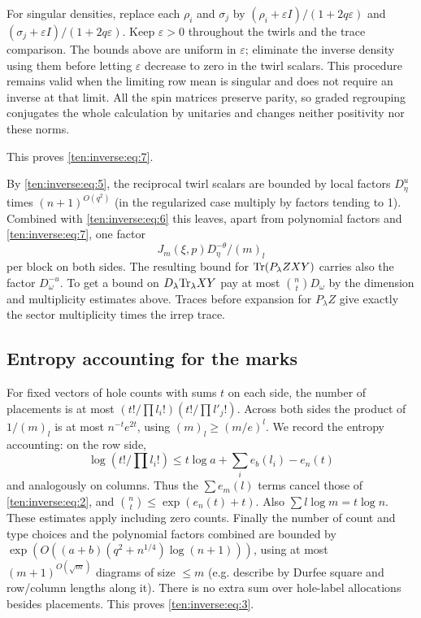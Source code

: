 For singular densities, replace each $\rho_i$ and $\sigma_j$ by
$(\rho_i+\varepsilon I)/(1+2q\varepsilon)$ and
$(\sigma_j+\varepsilon I)/(1+2q\varepsilon)$.  Keep
$\varepsilon>0$ throughout the twirls and the trace comparison.  The
bounds above are uniform in $\varepsilon$; eliminate the inverse density
using them before letting $\varepsilon$ decrease to zero in the twirl
scalars.  This procedure remains valid when the limiting row mean is
singular and does not require an inverse at that limit.  All the spin
matrices preserve parity, so graded regrouping conjugates the whole
calculation by unitaries and changes neither positivity nor these norms.

This proves \eqref{ten:inverse:eq:7}.

By \eqref{ten:inverse:eq:5}, the reciprocal twirl scalars are bounded by local factors \(D_\eta^u\) times \((n+1)^{O(q^2)}\) (in the regularized case multiply by factors tending to 1). Combined with \eqref{ten:inverse:eq:6} this leaves, apart from polynomial factors and \eqref{ten:inverse:eq:7}, one factor
\[
 J_m(\xi,p) D_\eta^{-\theta}/(m)_l
\]
per block on both sides. The resulting bound for \({\rm Tr}(P_\lambda Z XY)\) carries also the factor \(D_\omega^{-u}\). To get a bound on \(D_\lambda{\rm Tr}_\lambda XY\) pay at most \(\binom nt D_\omega\) by the dimension and multiplicity estimates above. Traces before expansion for \(P_\lambda Z\) give exactly the sector multiplicity times the irrep trace.

\subsection{Entropy accounting for the marks}
For fixed vectors of hole counts with sums \(t\) on each side, the number of placements is at most \((t!/\prod l_i!)(t!/\prod l'_j!)\). Across both sides the product of \(1/(m)_l\) is at most \(n^{-t}e^{2t}\), using \((m)_l\ge (m/e)^l\). We record the entropy accounting: on the row side,
\[
 \log(t!/\prod l_i!)\le t\log a+\sum_i e_b(l_i)-e_n(t)
\]
and analogously on columns. Thus the \(\sum e_m(l)\) terms cancel those of \eqref{ten:inverse:eq:2}, and \(\binom nt\le\exp(e_n(t)+t)\). Also \(\sum l\log m=t\log n\). These estimates apply including zero counts. Finally the number of count and type choices and the polynomial factors combined are bounded by \(\exp(O((a+b)(q^2+n^{1/4})\log(n+1)))\), using at most \((m+1)^{O(\sqrt m)}\) diagrams of size \(\le m\) (e.g. describe by Durfee square and row/column lengths along it). There is no extra sum over hole-label allocations besides placements. This proves \eqref{ten:inverse:eq:3}.

